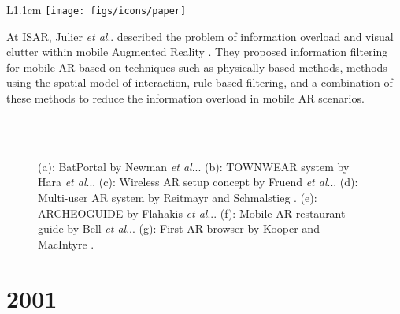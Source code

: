 \documentclass[12pt,a4paper]{article}
\makeatletter
\DeclareRobustCommand\onedot{\futurelet\@let@token\@onedot}
\def\@onedot{\ifx\@let@token.\else.\null\fi\xspace}
\def\etal{\emph{et al}\onedot}
\makeatother
\begin{document}
\vspace{0.1in}

\begin{wrapfigure}{L}{1.1cm}
	\vspace{-10pt}	
	\texttt{[image: figs/icons/paper]}
	\vspace{-10pt}		
\end{wrapfigure}
\noindent At ISAR, Julier \etal described the problem of information overload and visual clutter within mobile Augmented Reality \cite{Julier02}. They proposed information filtering for mobile AR based on techniques such as physically-based methods, methods using the spatial model of interaction, rule-based filtering, and a combination of these methods to reduce the information overload in mobile AR scenarios.


\begin{figure}[tbp]
\centering
\vspace{-10pt}
 \hfill
{} \\
 \hfill
{} \hfill
{} \\
 \hfill
{} 
\vspace{-10pt}
\caption{(a): BatPortal by Newman \etal \cite{Newman01}. (b): TOWNWEAR system by Hara \etal \cite{Satoh01}. (c): Wireless AR setup concept by Fruend \etal \cite{Fruend01}. (d): Multi-user AR system by Reitmayr and Schmalstieg \cite{Reitmayr01}. (e): ARCHEOGUIDE by Flahakis \etal \cite{Vlahakis2001}. (f): Mobile AR restaurant guide by Bell \etal \cite{Bell01}. (g): First AR browser by Kooper and MacIntyre \cite{Kooper03}.} \label{fig:seven}
\end{figure}

\vspace{-5pt}
\section*{2001}
\end{document}
